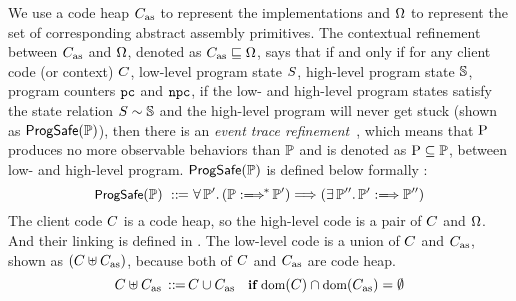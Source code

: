 We use a code heap $C_{\text{as}}$
to represent the implementations
 and $\Omega$ to represent the set of corresponding 
abstract assembly primitives. The contextual refinement between 
$C_{\text{as}}$ and $\Omega$, denoted as $C_{\text{as}} \sqsubseteq \Omega$, 
says that if and only if for any client code 
(or context) $C$, low-level program 
state $S$, high-level program state $\mathbb{S}$, program counters 
$\texttt{pc}$ and $\texttt{npc}$, if the low- and high-level program states satisfy the 
state relation ${S} \sim {\mathbb{S}}$ and the high-level program 
will never get stuck (shown as $\textsf{ProgSafe}(\mathbb{P})$), 
then there is an {\it event trace refinement}~\cite{liang14lics}, 
which means that $\text{P}$ produces no more observable behaviors 
than $\mathbb{P}$ and is denoted as $\text{P} \subseteq \mathbb{P}$,  
between low- and high-level program. $\textsf{ProgSafe}(\mathbb{P})$ 
is defined below formally : 
\[
    \small
    \progsafe(\HProg) \ \define \ 
    \forall \, \HProg'. \, 
    (\HGlobMultiTrans{\HProg}{}{*}{\HProg'}) 
    \Longrightarrow 
    (\exists \, \HProg''. \, 
        \HGlobTrans{\HProg'}{}{\HProg''})
\]
{\color{blue}
The client code $C$ is a \sparc{} code heap, so 
the high-level code is a pair of $C$ and $\Omega$. 
And their linking is defined in 
\Fig{\ref{fig:selected-opsem-high-level-prog}}. 
The low-level code is a union of $C$ and $C_{\text{as}}$, 
shown as $(C\uplus C_{\text{as}})$, because both of 
$C$ and $C_{\text{as}}$ are \sparc{} code heap.
\[
    \small
    C \uplus C_{\text{as}} \,::\!\!{=}\,
    C \cup C_{\text{as}} \quad
    \textbf{if} \ \text{dom}(C)\cap\text{dom}(C_{\text{as}}) = \emptyset
\] 
}

